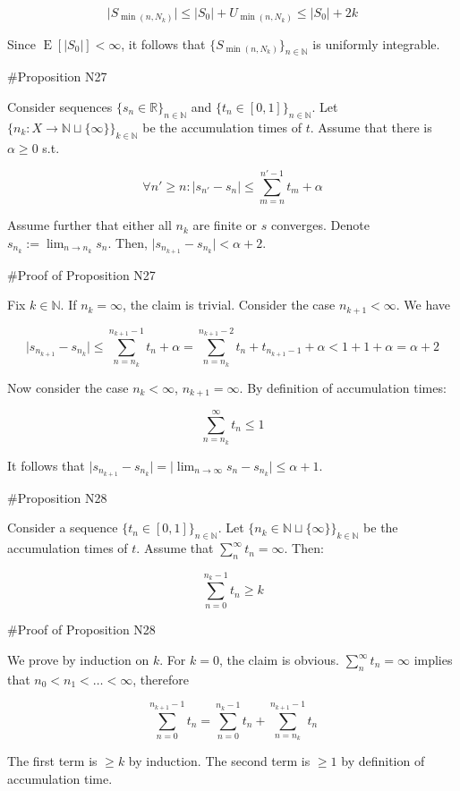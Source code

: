 \documentclass[a4paper]{article}
\DeclareMathOperator{\E}{E}
\newcommand{\Nats}{\mathbb{N}}
\newcommand{\Reals}{\mathbb{R}}
\newcommand{\Sq}[2]{\{#1\}_{#2 \in \Nats}}
\newcommand{\Sqn}[1]{\Sq{#1}{n}}
\newcommand{\Abs}[1]{\lvert #1 \rvert}
\begin{document}
$$\Abs{S_{\min(n,N_k)}} \leq \Abs{S_0} + U_{\min(n,N_k)} \leq \Abs{S_0} + 2k$$

Since ${\E[\Abs{S_0}] < \infty}$, it follows that ${\Sqn{S_{\min(n,N_k)}}}$ is uniformly integrable.

\#Proposition N27

Consider sequences ${\Sqn{s_n \in \Reals}}$ and ${\Sqn{t_n \in [0,1]}}$. Let ${\{n_k: X \rightarrow \Nats \sqcup \{\infty\}\}_{k \in \Nats}}$ be the accumulation times of ${t}$. Assume that there is ${\alpha \geq 0}$ s.t.

$${\forall n' \geq n: \Abs{s_{n'} - s_n} \leq \sum_{m=n}^{n'-1} t_m + \alpha}$$

Assume further that either all ${n_{k}}$ are finite or $s$ converges. Denote $s_{n_k}:=\lim_{n \rightarrow n_k} s_n$. Then, ${\Abs{s_{n_{k+1}}-s_{n_k}} < \alpha + 2}$.

\#Proof of Proposition N27

Fix ${k \in \Nats}$. If ${n_k = \infty}$, the claim is trivial. Consider the case ${n_{k+1} < \infty}$. We have

$$\Abs{s_{n_{k+1}}-s_{n_k}} \leq \sum_{n=n_k}^{n_{k+1}-1} t_n + \alpha = \sum_{n=n_k}^{n_{k+1}-2} t_n + t_{n_{k+1}-1} + \alpha < 1+1 + \alpha= \alpha + 2$$

Now consider the case ${n_k < \infty}$, ${n_{k+1} = \infty}$. By definition of accumulation times:

$$\sum_{n=n_k}^{\infty} t_n \leq 1$$

It follows that $\Abs{s_{n_{k+1}}-s_{n_k}} = \Abs{\lim_{n \rightarrow \infty} s_{n}-s_{n_k}} \leq \alpha + 1$.

\#Proposition N28

Consider a sequence ${\{t_n \in [0,1]\}_{n \in \Nats}}$. Let ${\{n_k \in \Nats \sqcup \{\infty\}\}_{k \in \Nats}}$ be the accumulation times of ${t}$. Assume that ${\sum_n^\infty t_n = \infty}$. Then:

$$\sum_{n = 0}^{n_k - 1} t_n \geq k$$

\#Proof of Proposition N28

We prove by induction on ${k}$. For ${k=0}$, the claim is obvious. ${\sum_n^\infty t_n = \infty}$ implies that ${n_0 < n_1 < \ldots < \infty}$, therefore

$$\sum_{n = 0}^{n_{k+1} - 1} t_n = \sum_{n = 0}^{n_{k} - 1} t_n + \sum_{n = n_k}^{n_{k+1} - 1} t_n$$

The first term is ${\geq k}$ by induction. The second term is ${\geq 1}$ by definition of accumulation time.
\end{document}
